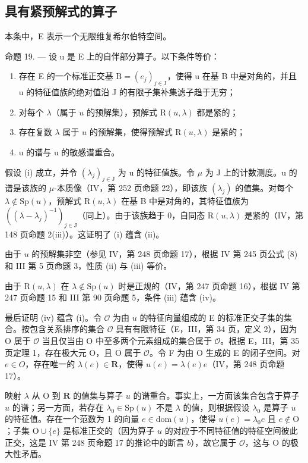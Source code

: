 \subsection{具有紧预解式的算子}

本条中，E 表示一个无限维复希尔伯特空间。

命题 19. --- 设 u 是 E 上的自伴部分算子。以下条件等价：

\begin{enumerate}
\def\labelenumi{(\roman{enumi})}
\item
  存在 E 的一个标准正交基 \(\mathrm{B} = (e_{j})_{j \in \mathrm{J}}\)，使得 u 在基 B 中是对角的，并且 u 的特征值族的绝对值沿 J 的有限子集补集滤子趋于无穷；
\item
  对每个 \(\lambda\)（属于 \(u\) 的预解集），预解式 \(\mathrm{R}(u,\lambda)\) 都是紧的；
\item
  存在复数 \(\lambda\) 属于 \(u\) 的预解集，使得预解式 \(\mathrm{R}(u,\lambda)\) 是紧的；
\item
  u 的谱与 u 的敏感谱重合。
\end{enumerate}

假设 (i) 成立，并令 \((\lambda_{j})_{j\in\mathrm{J}}\) 为 u 的特征值族。令 \(\mu\) 为 J 上的计数测度。u 的谱是该族的 \(\mu\)-本质像（IV，第 252 页命题 22），即该族 \((\lambda_{j})\) 的值集。对每个 \(\lambda\notin\mathrm{Sp}(u)\)，预解式 \(\mathrm{R}(u,\lambda)\) 在基 B 中是对角的，其特征值族为 \(((\lambda-\lambda_{j})^{-1})_{j\in\mathrm{J}}\)（同上）。由于该族趋于 0，自同态 \(\mathrm{R}(u,\lambda)\) 是紧的（IV，第 148 页命题 2(iii)）。这证明了 (i) 蕴含 (ii)。

由于 \(u\) 的预解集非空（参见 IV，第 248 页命题 17），根据 IV 第 245 页公式 (8) 和 III 第 5 页命题 3，性质 (ii) 与 (iii) 等价。

由于 \(\mathrm{R}(u,\lambda)\) 在 \(\lambda\notin\mathrm{Sp}(u)\) 时是正规的（IV，第 247 页命题 16），根据 IV 第 247 页命题 15 和 III 第 90 页命题 5，条件 (iii) 蕴含 (iv)。

最后证明 (iv) 蕴含 (i)。令 \(\mathcal{O}\) 为由 \(u\) 的特征向量组成的 E 的标准正交子集的集合。按包含关系排序的集合 \(\mathcal{O}\) 具有有限特征（E，III，第 34 页，定义 2），因为 O 属于 \(\mathcal{O}\) 当且仅当由 O 中至多两个元素组成的集合属于 \(\mathcal{O}\)。根据 E，III，第 35 页定理 1，存在极大元 O，且 O 属于 \(\mathcal{O}\)。令 F 为由 O 生成的 E 的闭子空间。对 \(e \in O\)，存在唯一的 \(\lambda(e) \in \mathbf{R}\)，使得 \(u(e) = \lambda(e)e\)（IV，第 248 页命题 17）。

 映射 \(\lambda\) 从 O 到 \(\mathbf{R}\) 的值集与算子 \(u\) 的谱重合。事实上，一方面该集合包含于算子 \(u\) 的谱；另一方面，若存在 \(\lambda_0 \in \mathrm{Sp}(u)\) 不是 \(\lambda\) 的值，则根据假设 \(\lambda_0\) 是算子 \(u\) 的特征值。存在一个范数为 1 的向量 \(e \in \mathrm{dom}(u)\)，使得 \(u(e) = \lambda_0 e\) 且 \(e \notin \mathrm{O}\)；子集 \(\mathrm{O} \cup \{e\}\) 是标准正交的（因为算子 \(u\) 的对应于不同特征值的特征空间彼此正交，这是 IV 第 248 页命题 17 的推论中的断言 \(b\)），故它属于 \(\mathcal{O}\)，这与 O 的极大性矛盾。

